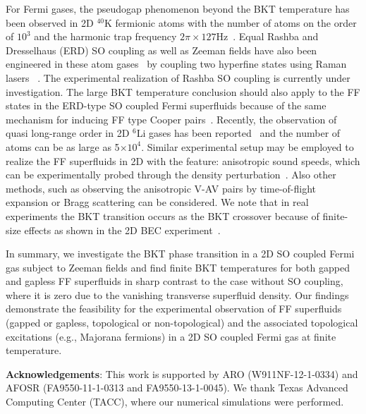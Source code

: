 \documentclass[prl,aps,twocolumn,showpacs, floatfix]{revtex4}
\begin{document}
For Fermi gases, the pseudogap phenomenon beyond the BKT temperature has
been observed in 2D $^{40}$K fermionic atoms with the number of atoms on the
order of $10^{3}$ and the harmonic trap frequency $2\pi \times 127$Hz~\cite%
{Feld2011Natrue}. Equal Rashba and Dresselhaus (ERD) SO coupling as well as
Zeeman fields have also been engineered in these atom gases~\cite%
{Jing2012PRL,Zwierlen2012PRL} by coupling two hyperfine states using Raman
lasers~\cite%
{Lin2011Nature,Jing2012PRL,Zwierlen2012PRL,PanJian2012PRL,Peter2013,Spilman2013PRL, Spilman2013NatRev}%
. The experimental realization of Rashba SO coupling is currently under
investigation. The large BKT temperature conclusion should also apply to the
FF states in the ERD-type SO coupled Fermi superfluids because of the same
mechanism for inducing FF type Cooper pairs~\cite{FanWu2013PRL,YongArx13}.
Recently, the observation of quasi long-range order in 2D $^{6}$Li gases has
been reported~\cite{Jochim2014arXiv} and the number of atoms can be as large
as 5$\times 10^{4}$. Similar experimental setup may be employed to realize
the FF superfluids in 2D with the feature: anisotropic sound speeds, which
can be experimentally probed through the density perturbation~\cite%
{Ketterle1997PRL}. Also other methods, such as observing the anisotropic
V-AV pairs by time-of-flight expansion or Bragg scattering can be
considered. We note that in real experiments the BKT transition occurs as
the BKT crossover because of finite-size effects as shown in the 2D BEC
experiment~\cite{Hadzibabic2006Nature}.

In summary, we investigate the BKT phase transition in a 2D SO coupled Fermi
gas subject to Zeeman fields and find finite BKT temperatures for both
gapped and gapless FF superfluids in sharp contrast to the case without SO
coupling, where it is zero due to the vanishing transverse superfluid
density. Our findings demonstrate the feasibility for the experimental
observation of FF superfluids (gapped or gapless, topological or
non-topological) and the associated topological excitations (e.g., Majorana
fermions) in a 2D SO coupled Fermi gas at finite temperature.

\begin{acknowledgments}
\textbf{Acknowledgements}: This work is supported by ARO (W911NF-12-1-0334)
and AFOSR (FA9550-11-1-0313 and FA9550-13-1-0045). We thank Texas Advanced
Computing Center (TACC), where our numerical simulations were performed.
\end{acknowledgments}
\end{document}

